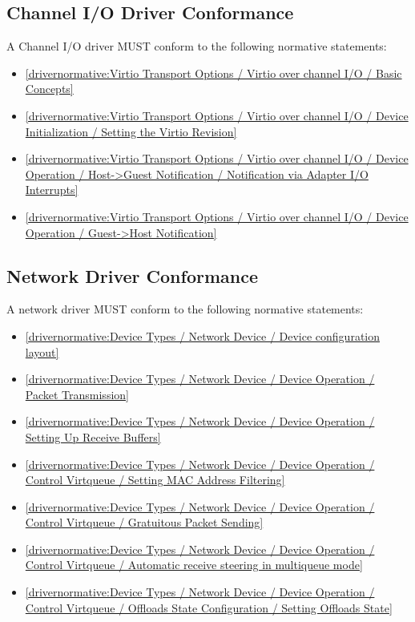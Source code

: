 \subsection{Channel I/O Driver Conformance}\label{sec:Conformance / Driver Conformance / Channel I/O Driver Conformance}

A Channel I/O driver MUST conform to the following normative statements:

\begin{itemize}
\item \ref{drivernormative:Virtio Transport Options / Virtio over channel I/O / Basic Concepts}
\item \ref{drivernormative:Virtio Transport Options / Virtio over channel I/O / Device Initialization / Setting the Virtio Revision}
\item \ref{drivernormative:Virtio Transport Options / Virtio over channel I/O / Device Operation / Host->Guest Notification / Notification via Adapter I/O Interrupts}
\item \ref{drivernormative:Virtio Transport Options / Virtio over channel I/O / Device Operation / Guest->Host Notification}
\end{itemize}

\subsection{Network Driver Conformance}\label{sec:Conformance / Driver Conformance / Network Driver Conformance}

A network driver MUST conform to the following normative statements:

\begin{itemize}
\item \ref{drivernormative:Device Types / Network Device / Device configuration layout}
\item \ref{drivernormative:Device Types / Network Device / Device Operation / Packet Transmission}
\item \ref{drivernormative:Device Types / Network Device / Device Operation / Setting Up Receive Buffers}
\item \ref{drivernormative:Device Types / Network Device / Device Operation / Control Virtqueue / Setting MAC Address Filtering}
\item \ref{drivernormative:Device Types / Network Device / Device Operation / Control Virtqueue / Gratuitous Packet Sending}
\item \ref{drivernormative:Device Types / Network Device / Device Operation / Control Virtqueue / Automatic receive steering in multiqueue mode}
\item \ref{drivernormative:Device Types / Network Device / Device Operation / Control Virtqueue / Offloads State Configuration / Setting Offloads State}
\end{itemize}

